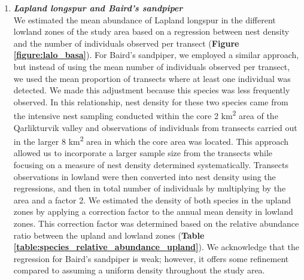 \documentclass[a4paper,twoside,12pt]{article}
\begin{document}
\begin{enumerate}[label=\alph*.]
        	\item[] \textit{\textbf{Lapland longspur and Baird’s sandpiper}}\\
        	We estimated the mean abundance of Lapland longspur in the different lowland zones of the study area based on a regression between nest density and the number of individuals observed per transect (\textbf{Figure \ref{figure:lalo_basa}}). For Baird’s sandpiper, we employed a similar approach, but instead of using the mean number of individuals observed per transect, we used the mean proportion of transects where at least one individual was detected. We made this adjustment because this species was less frequently observed. In this relationship, nest density for these two species came from the intensive nest sampling conducted within the core 2 km\textsuperscript{2} area of the Qarlikturvik valley and observations of individuals from transects carried out in the larger 8 km\textsuperscript{2} area in which the core area was located. This approach allowed us to incorporate a larger sample size from the transects while focusing on a measure of nest density determined systematically. Transects observations in lowland were then converted into nest density using the regressions, and then in total number of individuals by multiplying by the area and a factor 2. We estimated the density of both species in the upland zones by applying a correction factor to the annual mean density in lowland zones. This correction factor was determined based on the relative abundance ratio between the upland and lowland zones (\textbf{Table \ref{table:species_relative_abundance_upland}}). We acknowledge that the regression for Baird’s sandpiper is weak; however, it offers some refinement compared to assuming a uniform density throughout the study area. 
        	

\end{enumerate}
\end{document}
